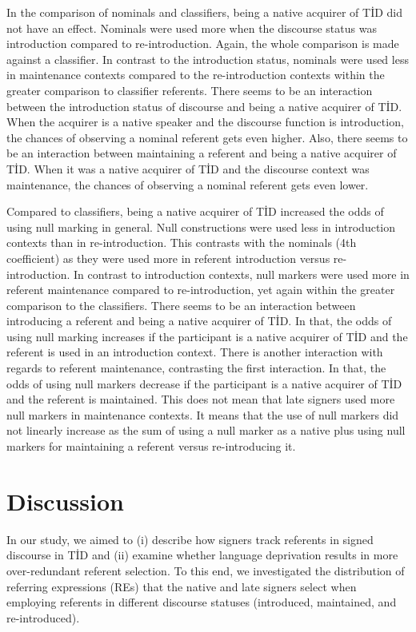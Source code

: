 \documentclass[]{elsarticle} %
\begin{document}
In the comparison of nominals and classifiers, being a native acquirer
of TİD did not have an effect. Nominals were used more when the
discourse status was introduction compared to re-introduction. Again,
the whole comparison is made against a classifier. In contrast to the
introduction status, nominals were used less in maintenance contexts
compared to the re-introduction contexts within the greater comparison
to classifier referents. There seems to be an interaction between the
introduction status of discourse and being a native acquirer of TİD.
When the acquirer is a native speaker and the discourse function is
introduction, the chances of observing a nominal referent gets even
higher. Also, there seems to be an interaction between maintaining a
referent and being a native acquirer of TİD. When it was a native
acquirer of TİD and the discourse context was maintenance, the chances
of observing a nominal referent gets even lower.

Compared to classifiers, being a native acquirer of TİD increased the
odds of using null marking in general. Null constructions were used less
in introduction contexts than in re-introduction. This contrasts with
the nominals (4th coefficient) as they were used more in referent
introduction versus re-introduction. In contrast to introduction
contexts, null markers were used more in referent maintenance compared
to re-introduction, yet again within the greater comparison to the
classifiers. There seems to be an interaction between introducing a
referent and being a native acquirer of TİD. In that, the odds of using
null marking increases if the participant is a native acquirer of TİD
and the referent is used in an introduction context. There is another
interaction with regards to referent maintenance, contrasting the first
interaction. In that, the odds of using null markers decrease if the
participant is a native acquirer of TİD and the referent is maintained.
This does not mean that late signers used more null markers in
maintenance contexts. It means that the use of null markers did not
linearly increase as the sum of using a null marker as a native plus
using null markers for maintaining a referent versus re-introducing it.

\hypertarget{discussion}{%
\section{Discussion}\label{discussion}}

In our study, we aimed to (i) describe how signers track referents in
signed discourse in TİD and (ii) examine whether language deprivation
results in more over-redundant referent selection. To this end, we
investigated the distribution of referring expressions (REs) that the
native and late signers select when employing referents in different
discourse statuses (introduced, maintained, and re-introduced).
\end{document}
